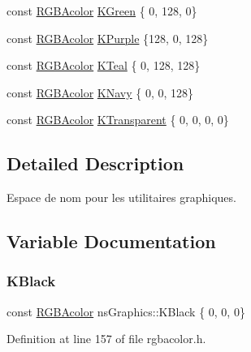 \begin{DoxyCompactItemize}
\item 
const \hyperlink{classns_graphics_1_1_r_g_b_acolor}{R\+G\+B\+Acolor} \hyperlink{namespacens_graphics_ad2a6c119991dbf9f510d68a420524704}{K\+Green} \{ 0, 128, 0\}
\item 
const \hyperlink{classns_graphics_1_1_r_g_b_acolor}{R\+G\+B\+Acolor} \hyperlink{namespacens_graphics_a43b5e5d4f7a1bc5f2928a5a8e312773b}{K\+Purple} \{128, 0, 128\}
\item 
const \hyperlink{classns_graphics_1_1_r_g_b_acolor}{R\+G\+B\+Acolor} \hyperlink{namespacens_graphics_a63e989cb02df1c3e6cbd40d0d3e3161d}{K\+Teal} \{ 0, 128, 128\}
\item 
const \hyperlink{classns_graphics_1_1_r_g_b_acolor}{R\+G\+B\+Acolor} \hyperlink{namespacens_graphics_a4ea1ef3950c89b063d76e0a13faf5ce8}{K\+Navy} \{ 0, 0, 128\}
\item 
const \hyperlink{classns_graphics_1_1_r_g_b_acolor}{R\+G\+B\+Acolor} \hyperlink{namespacens_graphics_ab2001ad03cceb2565849e04465618c1e}{K\+Transparent} \{ 0, 0, 0, 0\}
\end{DoxyCompactItemize}


\subsection{Detailed Description}
Espace de nom pour les utilitaires graphiques. 

\subsection{Variable Documentation}
\mbox{\label{namespacens_graphics_abf1d83a5438e750a393a0333bd9d5bd8}} 
\subsubsection{\texorpdfstring{K\+Black}{KBlack}}
{\footnotesize\ttfamily const \hyperlink{classns_graphics_1_1_r_g_b_acolor}{R\+G\+B\+Acolor} ns\+Graphics\+::\+K\+Black \{ 0, 0, 0\}}



Definition at line 157 of file rgbacolor.\+h.

\mbox{\label{namespacens_graphics_a64e9d947b926cdb9a7359e1d6f45a81e}} 

